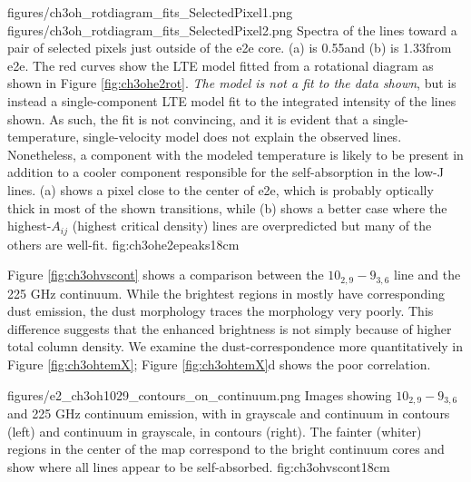 \documentclass{emulateapj}
\begin{document}
\FigureTwo
{figures/ch3oh_rotdiagram_fits_SelectedPixel1.png}
{figures/ch3oh_rotdiagram_fits_SelectedPixel2.png}
{Spectra of the \methanol lines toward a pair of selected pixels just outside
of the e2e core. (a) is 0.55\arcsec  and (b) is 1.33\arcsec from e2e.  The red
curves show the LTE model fitted from a rotational diagram as shown in Figure
\ref{fig:ch3ohe2rot}.  \emph{The model is not a fit to the data shown}, but is instead
a single-component LTE model fit to the integrated intensity of the lines
shown.  As such, the fit is not convincing, and it is evident that a
single-temperature, single-velocity model does not explain the observed lines.
Nonetheless, a component with the modeled temperature is likely to be present
in addition to a cooler component responsible for the self-absorption in the
low-J lines.  (a) shows a pixel close to the center of e2e, which is probably
optically thick in most of the shown transitions, while (b) shows a better case
where the highest-$A_{ij}$ (highest critical density) lines are overpredicted
but many of the others are well-fit.}
{fig:ch3ohe2epeaks}{1}{8cm}

Figure \ref{fig:ch3ohvscont} shows a comparison between the \methanol
$10_{2,9}-9_{3,6}$ line and the 225 GHz continuum.  While the brightest regions
in \methanol mostly have corresponding dust emission, the dust morphology
traces the \methanol morphology very poorly.  This difference suggests that the
enhanced brightness is not simply because of higher total column density.
We examine the dust-\methanol correspondence more quantitatively in Figure
\ref{fig:ch3ohtemX}; Figure \ref{fig:ch3ohtemX}d shows the poor correlation.

          {figures/e2_ch3oh1029_contours_on_continuum.png}
{Images showing \methanol $10_{2,9}-9_{3,6}$ and 225 GHz continuum emission,
with \methanol in grayscale and continuum in contours (left) and continuum in
grayscale, \methanol in contours (right).  The fainter (whiter) regions in the center
of the \methanol map correspond to the bright continuum cores and show where all lines
appear to be self-absorbed.}
{fig:ch3ohvscont}{1}{8cm}
\end{document}
